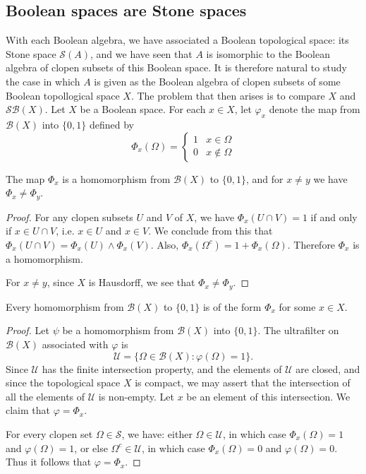 \subsection{Boolean spaces are Stone spaces}
With each Boolean algebra, we have associated a Boolean topological space: its Stone space $\mathcal{S}(A)$, and we have seen that $A$ is isomorphic to the Boolean algebra
of clopen subsets of this Boolean space. It is therefore natural to study the case in which $A$ is given as the Boolean algebra of clopen subsets of some Boolean topollogical 
space $X$. The problem that then arises is to compare $X$ and $\mathcal{S}\mathcal{B}(X)$.
Let $X$ be a Boolean space. For each $x\in X$, let $\varphi_x$ denote the map from $\mathcal{B}(X)$ into $\{0,1\}$ defined by
\[\varPhi_x(\Omega)=\begin{cases}
1&x\in\Omega\\
0&x\notin\Omega
\end{cases}\]
\begin{lemma}
The map $\varPhi_x$ is a homomorphism from $\mathcal{B}(X)$ to $\{0,1\}$, and for $x\neq y$ we have $\varPhi_x\neq\varPhi_y$.
\end{lemma}
\begin{proof}
For any clopen subsets $U$ and $V$ of $X$, we have $\varPhi_x(U\cap V)=1$ if and only if $x\in U\cap V$, i.e. $x\in U$ and $x\in V$. We conclude from this that 
$\varPhi_x(U\cap V)=\varPhi_x(U)\wedge\varPhi_x(V)$. Also, $\varPhi_x(\Omega^c)=1+\varPhi_x(\Omega)$. 
Therefore $\varPhi_x$ is a homomorphism.\par
For $x\neq y$, since $X$ is Hausdorff, we see that $\varPhi_x\neq\varPhi_y$.
\end{proof}
\begin{lemma}
Every homomorphism from $\mathcal{B}(X)$ to $\{0,1\}$ is of the form $\varPhi_x$ for some $x\in X$.
\end{lemma}
\begin{proof}
Let $\psi$ be a homomorphism from $\mathcal{B}(X)$ into $\{0,1\}$. The ultrafilter on $\mathcal{B}(X)$ associated with $\varphi$ is
\[\mathcal{U}=\{\Omega\in\mathcal{B}(X):\varphi(\Omega)=1\}.\]
Since $\mathcal{U}$ has the finite intersection property, and the elements of $\mathcal{U}$ are closed, and since the topological space $X$ is compact, we may assert that the intersection 
of all the elements of $\mathcal{U}$ is non-empty. Let $x$ be an element of this intersection. We claim that $\varphi=\varPhi_x$.\par
For every clopen set $\Omega\in\mathcal{S}$, we have: either $\Omega\in\mathcal{U}$, in which case $\varPhi_x(\Omega)=1$ and $\varphi(\Omega)=1$, or else $\Omega^c\in\mathcal{U}$, 
in which case $\varPhi_x(\Omega)=0$ and $\varphi(\Omega)=0$. Thus it follows that $\varphi=\varPhi_x$.
\end{proof}
